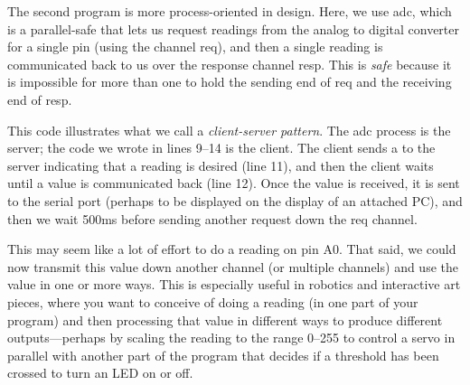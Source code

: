 The second program is more process-oriented in design. Here, we use {\code adc}, which is a parallel-safe \PROC that lets us request readings from the analog to digital converter for a single pin (using the \SIGNALT channel {\code req}), and then a single reading is communicated back to us over the response channel {\code resp}. This is \emph{safe} because it is impossible for more than one \PROC to hold the sending end of {\code req} and the receiving end of {\code resp}.

This code illustrates what we call a \emph{client-server pattern}. The {\code adc} process is the server; the code we wrote in lines 9--14 is the client. The client sends a \SIGNALV to the server indicating that a reading is desired (line 11), and then the client waits until a value is communicated back (line 12). Once the value is received, it is sent to the serial port (perhaps to be displayed on the display of an attached PC), and then we wait 500ms before sending another request down the {\code req} channel.

This may seem like a lot of effort to do a reading on pin {\constant A0}. That said, we could now transmit this value down another channel (or multiple channels) and use the value in one or more ways. This is especially useful in robotics and interactive art pieces, where you want to conceive of doing a reading (in one part of your program) and then processing that value in different ways to produce different outputs---perhaps by scaling the reading to the range 0--255 to control a servo in parallel with another part of the program that decides if a threshold has been crossed to turn an LED on or off.

\makingthingsbreak

\XXX

\seealso

\XXX